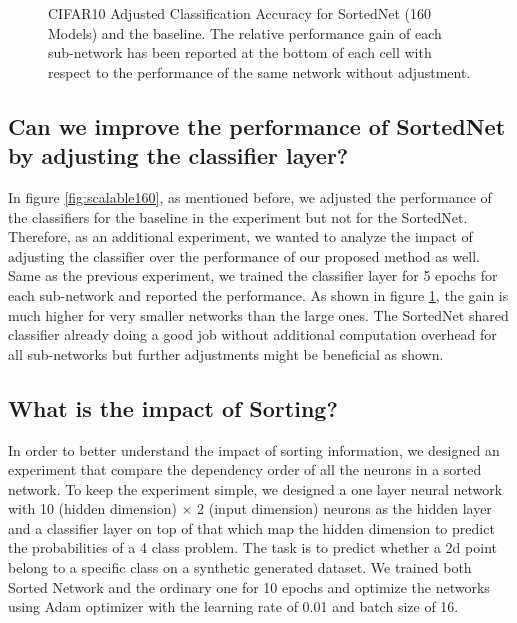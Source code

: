 \documentclass[letterpaper]{article} %
\begin{document}
\begin{figure}[htb!]
\hspace*{-1cm}
\centering
\resizebox{1.1\columnwidth}{!}{  
    }
\caption{CIFAR10 Adjusted Classification Accuracy for SortedNet (160 Models) and the baseline. The relative performance gain of each sub-network has been reported at the bottom of each cell with respect to the performance of the same network without adjustment.}
\label{fig:scalable160-adjusted}
\end{figure}

\subsection{Can we improve the performance of SortedNet by adjusting the classifier layer?}
\label{ap:adjusting-classifier}

In figure \ref{fig:scalable160}, as mentioned before, we adjusted the performance of the classifiers for the baseline in the experiment but not for the SortedNet. Therefore, as an additional experiment, we wanted to analyze the impact of adjusting the classifier over the performance of our proposed method as well. Same as the previous experiment, we trained the classifier layer for 5 epochs for each sub-network and reported the performance. As shown in figure \ref{fig:scalable160-adjusted}, the gain is much higher for very smaller networks than the large ones. The SortedNet shared classifier already doing a good job without additional computation overhead for all sub-networks but further adjustments might be beneficial as shown.

\subsection{What is the impact of Sorting?}
\label{ap:sorting_impact}

In order to better understand the impact of sorting information, we designed an experiment that compare the dependency order of all the neurons in a sorted network. To keep the experiment simple, we designed a one layer neural network with 10 (hidden dimension) $\times$ 2 (input dimension) neurons as the hidden layer and a classifier layer on top of that which map the hidden dimension to predict the probabilities of a 4 class problem. The task is to predict whether a 2d point belong to a specific class on a synthetic generated dataset. We trained both Sorted Network and the ordinary one for 10 epochs and optimize the networks using Adam optimizer \cite{kingma2017adam} with the learning rate of 0.01 and batch size of 16.
\end{document}

